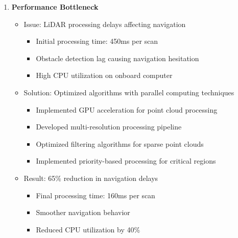 \documentclass[12pt]{article}
\begin{document}
\begin{enumerate}
    \item \textbf{Performance Bottleneck}
    \begin{itemize}
        \item Issue: LiDAR processing delays affecting navigation
        \begin{itemize}
            \item Initial processing time: 450ms per scan
            \item Obstacle detection lag causing navigation hesitation
            \item High CPU utilization on onboard computer
        \end{itemize}
        \item Solution: Optimized algorithms with parallel computing techniques
        \begin{itemize}
            \item Implemented GPU acceleration for point cloud processing
            \item Developed multi-resolution processing pipeline
            \item Optimized filtering algorithms for sparse point clouds
            \item Implemented priority-based processing for critical regions
        \end{itemize}
        \item Result: 65\% reduction in navigation delays
        \begin{itemize}
            \item Final processing time: 160ms per scan
            \item Smoother navigation behavior
            \item Reduced CPU utilization by 40\%
        \end{itemize}
    \end{itemize}
    

\end{enumerate}
\end{document}
